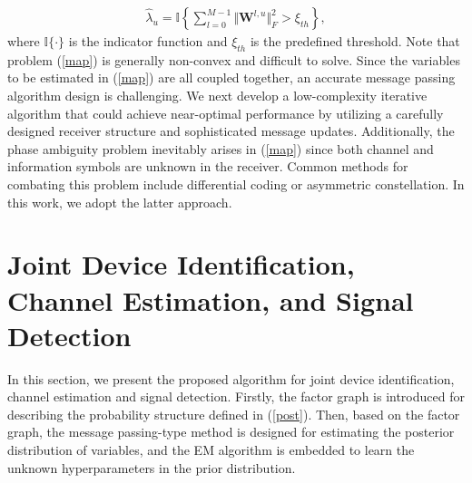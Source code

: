 \documentclass[conference]{IEEEtran}
\begin{document}
 \begin{align}
 	\label{detectA}
 	\hat{\lambda}_u = \mathbb{I}\left\{\sum_{l=0}^{M-1} \Vert\mathbf W^{l,u}\Vert_F^2 > \xi_{th}\right\}, 
 \end{align}
 where $\mathbb{I}\{\cdot\}$ is the indicator function and $\xi_{th}$ is the predefined threshold. Note that problem (\ref{map}) is generally non-convex and difficult to solve.
 Since the variables to be estimated in (\ref{map}) are all coupled together, an accurate message passing algorithm design is challenging. We next develop a low-complexity iterative algorithm that could achieve near-optimal performance by utilizing a carefully designed receiver structure and sophisticated message updates. Additionally, the phase ambiguity problem \cite{Joint1} inevitably arises in (\ref{map}) since both channel and information symbols are unknown in the receiver. Common methods for combating this problem include differential coding or asymmetric constellation\cite{phase1}. In this work, we adopt the latter approach.

	\section{Joint Device Identification, Channel Estimation, and Signal Detection}
	In this section, we present the proposed algorithm for joint device identification, channel estimation and signal detection.
	Firstly, the factor graph is introduced for describing the probability structure defined in (\ref{post}). Then, based on the factor graph, the message passing-type method is designed for estimating the posterior distribution of variables, and the EM algorithm is embedded to learn the unknown hyperparameters in the prior distribution. 
\end{document}
